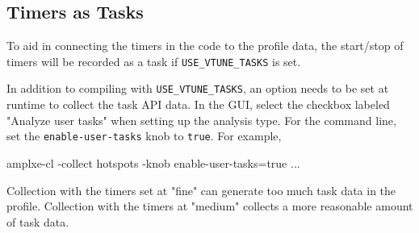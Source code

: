\subsection{Timers as Tasks}
To aid in connecting the timers in the code to the profile data, the start/stop of
timers will be recorded as a task if \texttt{USE\_VTUNE\_TASKS} is set.

In addition to compiling with \texttt{USE\_VTUNE\_TASKS}, an option needs to be set at runtime to collect the task API data.
In the GUI, select the checkbox labeled "Analyze user tasks" when setting up the analysis type.
For the command line, set the \texttt{enable-user-tasks} knob to \texttt{true}. For example,
\begin{shade}
amplxe-cl -collect hotspots -knob enable-user-tasks=true ...
\end{shade}

Collection with the timers set at "fine" can generate too much task data in the profile.
Collection with the timers at "medium" collects a more reasonable amount of task data.
